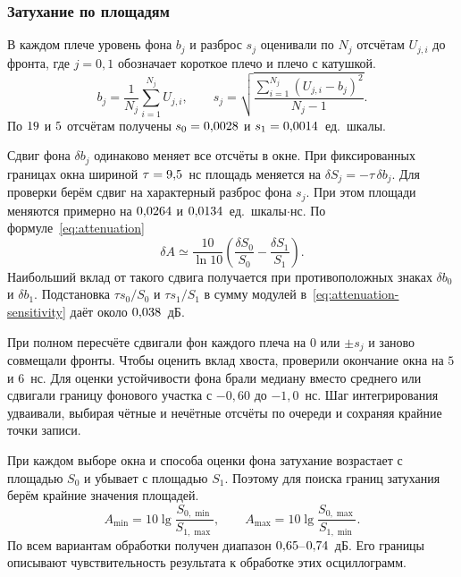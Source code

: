\documentclass[14pt,a4paper]{extarticle}
\numberwithin{equation}{section}
\numberwithin{figure}{section}
\numberwithin{table}{section}
\begin{document}
\subsubsection{Затухание по площадям}

В каждом плече уровень фона \(b_j\) и разброс \(s_j\)
оценивали по \(N_j\) отсчётам \(U_{j,i}\) до фронта,
где \(j=0,1\) обозначает короткое плечо и плечо с катушкой.
\[
 b_j=\frac{1}{N_j}\sum_{i=1}^{N_j}U_{j,i},
 \qquad
 s_j=\sqrt{\frac{\displaystyle\sum_{i=1}^{N_j}(U_{j,i}-b_j)^2}{N_j-1}}.
\]
По \(19\) и \(5\) отсчётам получены
\(s_0=0{,}0028\) и \(s_1=0{,}0014\)~ед.~шкалы.

\begin{samepage}
Сдвиг фона \(\delta b_j\) одинаково меняет все отсчёты
в окне. При фиксированных границах окна шириной
\(\tau=9{,}5\)~нс площадь меняется на
\(\delta S_j=-\tau\,\delta b_j\).
Для проверки берём сдвиг на характерный разброс фона \(s_j\).
При этом площади меняются примерно на
\(0{,}0264\) и \(0{,}0134\)~ед.~шкалы\(\cdot\)нс.
По формуле~\eqref{eq:attenuation}
\begin{equation}
 \delta A\simeq\frac{10}{\ln 10}
       \left(\frac{\delta S_0}{S_0}-\frac{\delta S_1}{S_1}\right).
 \label{eq:attenuation-sensitivity}
\end{equation}
Наибольший вклад от такого сдвига получается при
противоположных знаках \(\delta b_0\) и \(\delta b_1\).
Подстановка \(\tau s_0/S_0\) и \(\tau s_1/S_1\) в сумму
модулей в~\eqref{eq:attenuation-sensitivity} даёт около
\(0{,}038\)~дБ.
\par
\end{samepage}

При полном пересчёте сдвигали фон каждого плеча на
\(0\) или \(\pm s_j\) и заново совмещали фронты. Чтобы
оценить вклад хвоста, проверили окончание окна на \(5\) и
\(6\)~нс. Для оценки устойчивости фона брали медиану вместо
среднего или сдвигали границу фонового участка с
\(-0{,}60\) до \(-1{,}0\)~нс. Шаг интегрирования удваивали,
выбирая чётные и нечётные отсчёты по очереди и сохраняя
крайние точки записи.

При каждом выборе окна и способа оценки фона затухание
возрастает с площадью \(S_0\) и убывает с площадью \(S_1\).
Поэтому для поиска границ затухания берём крайние значения
площадей.
\[
 A_{\min}=10\lg\frac{S_{0,\min}}{S_{1,\max}},
 \qquad
 A_{\max}=10\lg\frac{S_{0,\max}}{S_{1,\min}}.
\]
По всем вариантам обработки получен диапазон
\(0{,}65\)--\(0{,}74\)~дБ. Его границы описывают
чувствительность результата к обработке этих осциллограмм.
\end{document}
